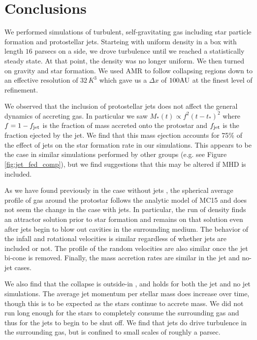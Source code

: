\documentclass[../dissertation.tex]{subfiles}
\begin{document}
\section{Conclusions}\label{sec:jet_conclusions}
We performed simulations of turbulent, self-gravitating gas including star particle formation and protostellar jets. %
Starteing with uniform density in a box with length $16$ parsecs on a side, we drove turbulence until we reached a statistically steady state.
At that point, the density was no longer uniform.
We then turned on gravity and star formation.
We used AMR to follow collapsing regions down to an effective resolution of $32 \, K^3$ which gave us a $\Delta x$ of $100 {\rm AU}$ at the finest level of refinement.

We observed that the inclusion of protostellar jets does not affect the general dynamics of accreting gas.
In particular we saw $M_*(t) \propto f^2 (t-t_*)^2$ where $f = 1 - f_{\rm jet}$ is the fraction of mass accreted onto the protostar and $f_{\rm jet}$ is the fraction ejected by the jet.
We find that this mass ejection accounts for 75\% of the effect of jets on the star formation rate in our simulations.
This appears to be the case in similar simulations performed by other groups (e.g. see Figure \ref{fig:jet_fed_comp}), but we find suggestions that this may be altered if MHD is included.

As we have found previously in the case without jets \citep{2017MNRAS.465.1316M}, the spherical average profile of gas around the protostar follows the analytic model of MC15 and does not seem the change in the case with jets.  In particular, the run of density finds an attractor solution prior to star formation and remains on that solution even after jets begin to blow out cavities in the surrounding medium.
The behavior of the infall and rotational velocities is similar regardless of whether jets are included or not.
The profile of the random velocities are also similar once the jet bi-cone is removed.  Finally, the mass accretion rates are similar in the jet and no-jet cases.

We also find that the collapse is outside-in  \citep{2017MNRAS.465.1316M}, and holds for both the jet and no jet simulations.
The average jet momentum per stellar mass does increase over time, though this is to be expected as the stars continue to accrete mass.
We did not run long enough for the stars to completely consume the surrounding gas and thus for the jets to begin to be shut off.
We find that jets do drive turbulence in the surrounding gas, but is confined to small scales of roughly a parsec.
\end{document}
